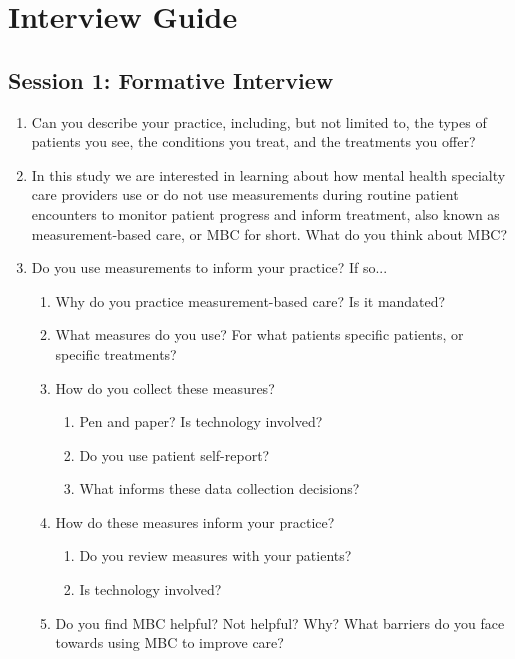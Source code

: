 \clearpage
\section{Interview Guide}
\label{appendix:guide}

\subsection{Session 1: Formative Interview}

\begin{enumerate}
    \item Can you describe your practice, including, but not limited to, the types of patients you see, the conditions you treat, and the treatments you offer?
    \item In this study we are interested in learning about how mental health specialty care providers use or do not use measurements during routine patient encounters to monitor patient progress and inform treatment, also known as measurement-based care, or MBC for short. What do you think about MBC? 
    \item Do you use measurements to inform your practice? If so...
    \begin{enumerate}
        \item Why do you practice measurement-based care? Is it mandated?
        \item What measures do you use? For what patients specific patients, or specific treatments?
        \item How do you collect these measures? 
        \begin{enumerate}
            \item Pen and paper? Is technology involved? 
            \item Do you use patient self-report?
            \item What informs these data collection decisions?
        \end{enumerate}
        \item How do these measures inform your practice?
        \begin{enumerate}
            \item Do you review measures with your patients?
            \item Is technology involved?
        \end{enumerate}
        \item Do you find MBC helpful? Not helpful? Why? What barriers do you face towards using MBC to improve care?

\end{enumerate}
\end{enumerate}
